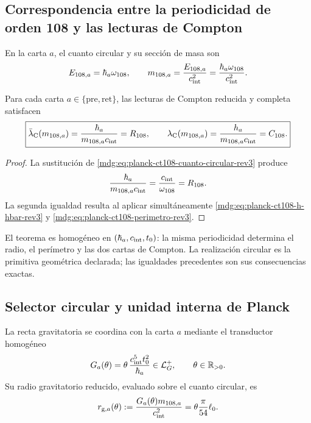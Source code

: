 \subsection{Correspondencia entre la periodicidad de orden 108 y las lecturas de Compton}

En la carta \(a\), el cuanto circular y su sección de masa son
\begin{equation}
 E_{108,a}=\hbar_a\omega_{108},
 \qquad
 m_{108,a}=\frac{E_{108,a}}{c_{\rm int}^{2}}
 =\frac{\hbar_a\omega_{108}}{c_{\rm int}^{2}}.
 \label{mdg:eq:planck-ct108-cuanto-circular-rev3}
\end{equation}

\begin{theorem}
\label{mdg:thm:planck-ct108-compton-rev3}
Para cada carta \(a\in\{\mathrm{pre},\mathrm{ret}\}\), las lecturas de
Compton reducida y completa satisfacen
\begin{equation}
 \boxed{
 \bar\lambda_{\rm C}(m_{108,a})
 =\frac{\hbar_a}{m_{108,a}c_{\rm int}}=R_{108},
 \qquad
 \lambda_{\rm C}(m_{108,a})
 =\frac{h_a}{m_{108,a}c_{\rm int}}=C_{108}.}
 \label{mdg:eq:planck-ct108-identidad-compton-rev3}
\end{equation}
\end{theorem}

\begin{proof}
La sustitución de
\eqref{mdg:eq:planck-ct108-cuanto-circular-rev3} produce
\[
 \frac{\hbar_a}{m_{108,a}c_{\rm int}}
 =\frac{c_{\rm int}}{\omega_{108}}=R_{108}.
\]
La segunda igualdad resulta al aplicar simultáneamente
\eqref{mdg:eq:planck-ct108-h-hbar-rev3} y
\eqref{mdg:eq:planck-ct108-perimetro-rev3}.
\end{proof}

El teorema es homogéneo en
\((\hbar_a,c_{\rm int},t_0)\): la misma periodicidad determina el radio,
el perímetro y las dos cartas de Compton. La realización circular es la
primitiva geométrica declarada; las igualdades precedentes son sus
consecuencias exactas.

\subsection{Selector circular y unidad interna de Planck}

La recta gravitatoria se coordina con la carta \(a\) mediante el transductor
homogéneo
\begin{equation}
 G_a(\theta)=\theta\,
 \frac{c_{\rm int}^{5}t_0^2}{\hbar_a}
 \in\mathcal L_G^+,
 \qquad \theta\in\mathbb R_{>0}.
 \label{mdg:eq:planck-ct108-transductor-rev3}
\end{equation}
Su radio gravitatorio reducido, evaluado sobre el cuanto circular, es
\begin{equation}
 r_{{\rm g},a}(\theta)
 :=\frac{G_a(\theta)m_{108,a}}{c_{\rm int}^{2}}
 =\theta\frac{\pi}{54}\ell_0.
 \label{mdg:eq:planck-ct108-radio-gravitatorio-rev3}
\end{equation}

